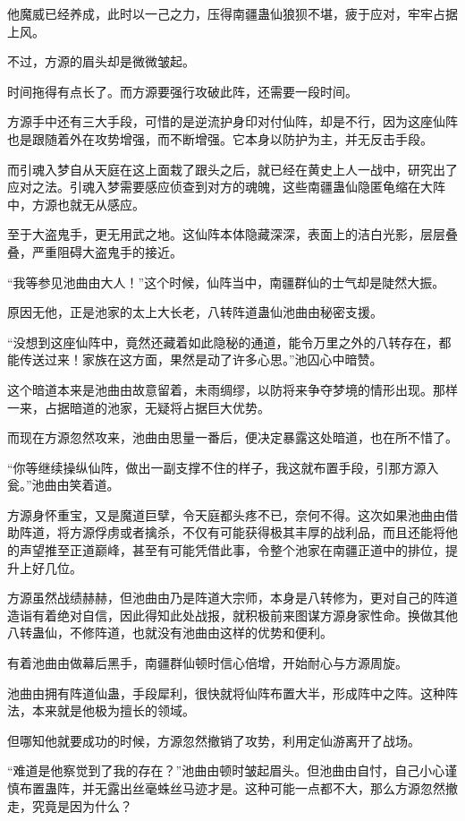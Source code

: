 \begin{this_body}
他魔威已经养成，此时以一己之力，压得南疆蛊仙狼狈不堪，疲于应对，牢牢占据上风。

不过，方源的眉头却是微微皱起。

时间拖得有点长了。而方源要强行攻破此阵，还需要一段时间。

方源手中还有三大手段，可惜的是逆流护身印对付仙阵，却是不行，因为这座仙阵也是跟随着外在攻势增强，而不断增强。它本身以防护为主，并无反击手段。

而引魂入梦自从天庭在这上面栽了跟头之后，就已经在黄史上人一战中，研究出了应对之法。引魂入梦需要感应侦查到对方的魂魄，这些南疆蛊仙隐匿龟缩在大阵中，方源也就无从感应。

至于大盗鬼手，更无用武之地。这仙阵本体隐藏深深，表面上的洁白光影，层层叠叠，严重阻碍大盗鬼手的接近。

“我等参见池曲由大人！”这个时候，仙阵当中，南疆群仙的士气却是陡然大振。

原因无他，正是池家的太上大长老，八转阵道蛊仙池曲由秘密支援。

“没想到这座仙阵中，竟然还藏着如此隐秘的通道，能令万里之外的八转存在，都能传送过来！家族在这方面，果然是动了许多心思。”池囚心中暗赞。

这个暗道本来是池曲由故意留着，未雨绸缪，以防将来争夺梦境的情形出现。那样一来，占据暗道的池家，无疑将占据巨大优势。

而现在方源忽然攻来，池曲由思量一番后，便决定暴露这处暗道，也在所不惜了。

“你等继续操纵仙阵，做出一副支撑不住的样子，我这就布置手段，引那方源入瓮。”池曲由笑着道。

方源身怀重宝，又是魔道巨擘，令天庭都头疼不已，奈何不得。这次如果池曲由借助阵道，将方源俘虏或者擒杀，不仅有可能获得极其丰厚的战利品，而且还能将他的声望推至正道巅峰，甚至有可能凭借此事，令整个池家在南疆正道中的排位，提升上好几位。

方源虽然战绩赫赫，但池曲由乃是阵道大宗师，本身是八转修为，更对自己的阵道造诣有着绝对自信，因此得知此处战报，就积极前来图谋方源身家性命。换做其他八转蛊仙，不修阵道，也就没有池曲由这样的优势和便利。

有着池曲由做幕后黑手，南疆群仙顿时信心倍增，开始耐心与方源周旋。

池曲由拥有阵道仙蛊，手段犀利，很快就将仙阵布置大半，形成阵中之阵。这种阵法，本来就是他极为擅长的领域。

但哪知他就要成功的时候，方源忽然撤销了攻势，利用定仙游离开了战场。

“难道是他察觉到了我的存在？”池曲由顿时皱起眉头。但池曲由自忖，自己小心谨慎布置蛊阵，并无露出丝毫蛛丝马迹才是。这种可能一点都不大，那么方源忽然撤走，究竟是因为什么？


\end{this_body}
